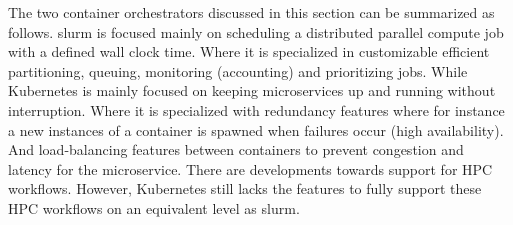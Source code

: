 \documentclass[conference]{IEEEtran}
\begin{document}


The two container orchestrators discussed in this section can be summarized as follows. \gls{slurm} is focused mainly on scheduling a distributed parallel compute job with a defined wall clock time. Where it is specialized in customizable efficient partitioning, queuing, monitoring (accounting) and prioritizing jobs. While Kubernetes is mainly focused on keeping microservices up and running without interruption. Where it is specialized with redundancy features where for instance a new instances of a container is spawned when failures occur (high availability). And load-balancing features between containers to prevent congestion and latency for the microservice. There are developments towards support for HPC workflows. However, Kubernetes still lacks the features to fully support these HPC workflows on an equivalent level as \gls{slurm}.




\end{document}
